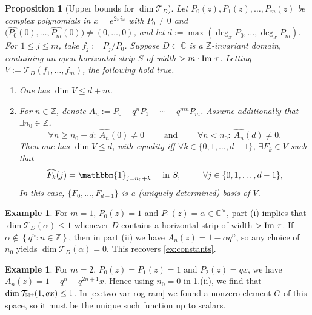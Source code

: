 \documentclass[reqno,11pt]{amsart}
\newtheorem{proposition}[theorem]{Proposition}
\theoremstyle{definition}
\newtheorem{example}[theorem]{Example}
\theoremstyle{remark}
\numberwithin{equation}{section}
\newcommand{\Z}{\mathbb{Z}}
\newcommand{\C}{\mathbb{C}}
\newcommand{\Hplus}{{\mathbb{H}^{\textnormal{+}\hspace{-0.03cm}}}}
\newcommand{\mT}{\mathcal{T}}
\newcommand{\one}{\mathbbm{1}}
\renewcommand{\Im}{\textnormal{Im}\ }
\renewcommand{\hat}{\widehat}
\begin{document}
\begin{proposition}[Upper bounds for $\dim \mT_D$] \label{prop:upper-bounds}
Let $P_0(z), P_1(z), \ldots, P_m(z)$ be complex polynomials in $x = e^{2\pi i z}$ with $P_0 \neq 0$ and $\big(\hat{P_0}(0), \ldots, \hat{P_m}(0)\big) \neq (0, \ldots, 0)$, and let $d := \max(\deg_x P_0, \ldots, \deg_x P_m)$. For $1 \le j \le m$, take $f_j := P_j/P_0$. Suppose $D \subset \C$ is a $\Z$-invariant domain, containing an open horizontal strip $S$ of width $> m \cdot \Im \tau$. Letting $V := \mT_D\left(f_1, \ldots, f_m\right)$, the following hold true.
\begin{enumerate}[label=(\roman*).]
    \item
One has $\dim V \le d + m$. 
    \item
For $n \in \Z$, denote $A_n := P_0 - q^n P_1 - \cdots - q^{mn} P_m$. Assume additionally that $\exists n_0 \in \Z$,
\[
\forall n \ge n_0 + d :\  \hat{A_n}(0) \neq 0  \qquad \text{ and } \qquad \forall n < n_0 :\  \hat{A_n}(d) \neq 0.
\]
Then one has $\dim V \le d$, with equality iff $\forall k \in \{0, 1, \ldots, d-1\}$, $\exists F_k \in V$ such that
\[
    \hat{F_k}(j) = \one_{j = n_0 + k} \quad \text{ in } S, \quad\quad\hspace{0.2cm}  \forall j \in \{0, 1, \ldots, d-1\},
\]
In this case, $\{F_0, \ldots, F_{d-1}\}$ is a (uniquely determined) basis of $V$.
\end{enumerate}
\end{proposition}

\begin{example} \label{ex:constants-ctd}
For $m = 1$, $P_0(z) = 1$ and $P_1(z) = \alpha \in \C^\times$, part (i) implies that $\dim \mT_D(\alpha) \le 1$ whenever $D$ contains a horizontal strip of width $> \Im \tau$. If $\alpha \not\in \left\{q^n : n \in \Z\right\}$, then in part (ii) we have $A_n(z) = 1 - \alpha q^n$, so any choice of $n_0$ yields $\dim \mT_D(\alpha) = 0$. This recovers \cref{ex:constants}.
\end{example}

\begin{example} \label{ex:two-var-rog-ram-ctd}
For $m = 2$, $P_0(z) = P_1(z) = 1$ and $P_2(z) = qx$, we have $A_n(z) = 1 - q^n - q^{2n+1}x$. Hence using $n_0 = 0$ in \cref{prop:upper-bounds}.(ii), we find that $\dim \mT_\Hplus(1, qx) \le 1$. In \cref{ex:two-var-rog-ram} we found a nonzero element $G$ of this space, so it must be the unique such function up to scalars.
\end{example}
\end{document}
